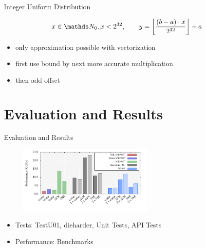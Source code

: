 \documentclass[aspectratio=169]{beamer}
\begin{document}
    \begin{frame}{Integer Uniform Distribution}
      \begin{mybox}
        \[
          x\in\setNatural_0, x < 2^{32},\qquad y = \floorBrackets{\frac{(b-a)\cdot x}{2^{32}}} + a
        \]
      \end{mybox}
      \begin{itemize}
        \item only approximation possible with vectorization
        \item first use bound by next more accurate multiplication
        \item then add offset
      \end{itemize}
    \end{frame}

  \section{Evaluation and Results} %
  \label{sec:evaluation_and_results}
    \begin{frame}{Evaluation and Results}
      \begin{figure}
        \includegraphics[width=0.6\textwidth]{figures/generation_desktop.pdf}
      \end{figure}
      \begin{itemize}
        \item Tests: TestU01, dieharder, Unit Tests, API Tests
        \item Performance: Benchmarks
      \end{itemize}
    \end{frame}
\end{document}
